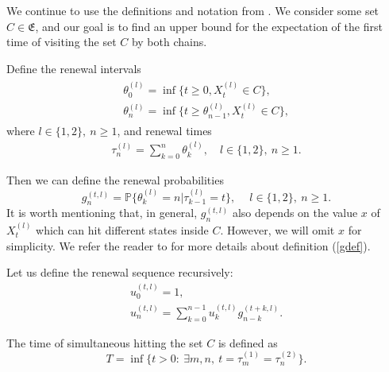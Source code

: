 \documentclass[numbers,compress,v1.0.1]{vmsta}
\newcommand{\lsum}{\sum\limits}
\theoremstyle{definition}
\begin{document}
We continue to use the definitions and notation from \cite{Coupling}.
We consider some set $C \in\mathfrak{E}$,
and our goal is to find an upper bound for the
expectation of the first time of visiting the set $C$ by both chains.

Define the renewal intervals
%
\begin{align}
%
\begin{array}{c}
\theta^{(l)}_0 = \inf\bigl\{t \ge0, X^{(l)}_t \in C\bigr\},\\[3pt]
\theta^{(l)}_n = \inf\bigl\{t \ge\theta^{(l)}_{n-1}, X^{(l)}_t \in C \bigr\},
\end{array} %
\end{align}
%
where $l\in\{1,2\},\ n\ge1$, and renewal times
%
\begin{align}
\tau^{(l)}_n = \lsum_{k=0}^n
\theta^{(l)}_k, \quad l \in\{1,2\}, \ n\ge1.
\end{align}

Then we can define the renewal probabilities
\begingroup
\abovedisplayskip=5pt
\belowdisplayskip=5pt
%
\begin{equation}
\label{gdef} g^{(t,l)}_{n} = \mathbb{P}\bigl\{
\theta^{(l)}_k = n \big| \tau^{(l)}_{k-1} = t
\bigr\},\quad \ l\in\{1,2\}, \ n\ge1.
\end{equation}
%
It is worth mentioning that, in general, $g^{(t,l)}_n$ also depends on
the value $x$ of $X^{(l)}_t$ which can hit different states inside $C$.
However, we will omit $x$ for simplicity.
We refer the reader to \cite{Coupling} for more details about
definition (\ref{gdef}).

Let us define the renewal sequence recursively:
%
\begin{equation}
%
\begin{array}{c}
u^{(t,l)}_0 = 1,\\[3pt]
\displaystyle u^{(t,l)}_n = \lsum_{k=0}^{n-1} u^{(t,l)}_k g^{(t+k, l)}_{n-k}.
\end{array} %
\end{equation}

The time of simultaneous hitting the set $C$ is defined as
%
\begin{equation}
T = \inf\bigl\{ t >0:\ \exists m, n,\ t = \tau^{(1)}_m =
\tau^{(2)}_n \bigr\}.
\end{equation}
\end{document}
